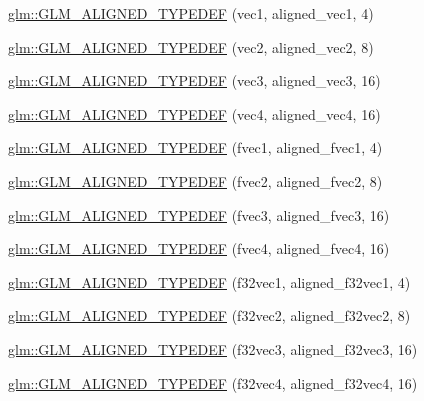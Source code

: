 \begin{DoxyCompactItemize}
\item 
\hyperlink{group__gtx__type__aligned_ga81bc497b2bfc6f80bab690c6ee28f0f9}{glm\+::\+G\+L\+M\+\_\+\+A\+L\+I\+G\+N\+E\+D\+\_\+\+T\+Y\+P\+E\+D\+E\+F} (vec1, aligned\+\_\+vec1, 4)
\item 
\hyperlink{group__gtx__type__aligned_gada3e8f783e9d4b90006695a16c39d4d4}{glm\+::\+G\+L\+M\+\_\+\+A\+L\+I\+G\+N\+E\+D\+\_\+\+T\+Y\+P\+E\+D\+E\+F} (vec2, aligned\+\_\+vec2, 8)
\item 
\hyperlink{group__gtx__type__aligned_gab8d081fac3a38d6f55fa552f32168d32}{glm\+::\+G\+L\+M\+\_\+\+A\+L\+I\+G\+N\+E\+D\+\_\+\+T\+Y\+P\+E\+D\+E\+F} (vec3, aligned\+\_\+vec3, 16)
\item 
\hyperlink{group__gtx__type__aligned_ga12fe7b9769c964c5b48dcfd8b7f40198}{glm\+::\+G\+L\+M\+\_\+\+A\+L\+I\+G\+N\+E\+D\+\_\+\+T\+Y\+P\+E\+D\+E\+F} (vec4, aligned\+\_\+vec4, 16)
\item 
\hyperlink{group__gtx__type__aligned_gaefab04611c7f8fe1fd9be3071efea6cc}{glm\+::\+G\+L\+M\+\_\+\+A\+L\+I\+G\+N\+E\+D\+\_\+\+T\+Y\+P\+E\+D\+E\+F} (fvec1, aligned\+\_\+fvec1, 4)
\item 
\hyperlink{group__gtx__type__aligned_ga2543c05ba19b3bd19d45b1227390c5b4}{glm\+::\+G\+L\+M\+\_\+\+A\+L\+I\+G\+N\+E\+D\+\_\+\+T\+Y\+P\+E\+D\+E\+F} (fvec2, aligned\+\_\+fvec2, 8)
\item 
\hyperlink{group__gtx__type__aligned_ga009afd727fd657ef33a18754d6d28f60}{glm\+::\+G\+L\+M\+\_\+\+A\+L\+I\+G\+N\+E\+D\+\_\+\+T\+Y\+P\+E\+D\+E\+F} (fvec3, aligned\+\_\+fvec3, 16)
\item 
\hyperlink{group__gtx__type__aligned_ga2f26177e74bfb301a3d0e02ec3c3ef53}{glm\+::\+G\+L\+M\+\_\+\+A\+L\+I\+G\+N\+E\+D\+\_\+\+T\+Y\+P\+E\+D\+E\+F} (fvec4, aligned\+\_\+fvec4, 16)
\item 
\hyperlink{group__gtx__type__aligned_ga309f495a1d6b75ddf195b674b65cb1e4}{glm\+::\+G\+L\+M\+\_\+\+A\+L\+I\+G\+N\+E\+D\+\_\+\+T\+Y\+P\+E\+D\+E\+F} (f32vec1, aligned\+\_\+f32vec1, 4)
\item 
\hyperlink{group__gtx__type__aligned_ga5e185865a2217d0cd47187644683a8c3}{glm\+::\+G\+L\+M\+\_\+\+A\+L\+I\+G\+N\+E\+D\+\_\+\+T\+Y\+P\+E\+D\+E\+F} (f32vec2, aligned\+\_\+f32vec2, 8)
\item 
\hyperlink{group__gtx__type__aligned_gade4458b27b039b9ca34f8ec049f3115a}{glm\+::\+G\+L\+M\+\_\+\+A\+L\+I\+G\+N\+E\+D\+\_\+\+T\+Y\+P\+E\+D\+E\+F} (f32vec3, aligned\+\_\+f32vec3, 16)
\item 
\hyperlink{group__gtx__type__aligned_ga2e8a12c5e6a9c4ae4ddaeda1d1cffe3b}{glm\+::\+G\+L\+M\+\_\+\+A\+L\+I\+G\+N\+E\+D\+\_\+\+T\+Y\+P\+E\+D\+E\+F} (f32vec4, aligned\+\_\+f32vec4, 16)

\end{DoxyCompactItemize}
